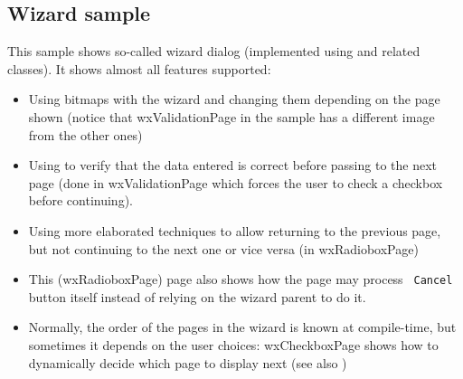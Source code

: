 \subsection{Wizard sample}\label{samplewizard}

This sample shows so-called wizard dialog (implemented using 
 and related classes). It shows almost all
features supported:

\begin{itemize}\itemsep=0pt
\item Using bitmaps with the wizard and changing them depending on the page
shown (notice that wxValidationPage in the sample has a different image from
the other ones)
\item Using  
to verify that the data entered is correct before passing to the next page
(done in wxValidationPage which forces the user to check a checkbox before
continuing).
\item Using more elaborated techniques to allow returning to the previous
page, but not continuing to the next one or vice versa (in wxRadioboxPage)
\item This (wxRadioboxPage) page also shows how the page may process {\tt
Cancel} button itself instead of relying on the wizard parent to do it.
\item Normally, the order of the pages in the wizard is known at compile-time,
but sometimes it depends on the user choices: wxCheckboxPage shows how to
dynamically decide which page to display next (see also 
)
\end{itemize}


